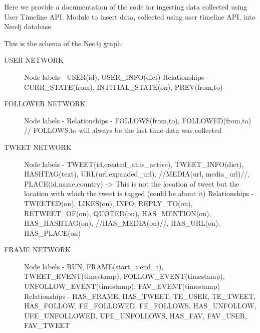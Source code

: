 \documentclass[letterpaper,10pt,english]{sphinxmanual}
\begin{document}
Here we provide a documentation of the code for ingesting data collected using User Timeline API.
\label{\detokenize{neo4j_data_ingestion:module-ingest_neo4j_user_timeline}}
Module to insert data, collected using user timeline API, into Neo4j database.

This is the schema of the Neo4j graph:
\begin{description}
\item[{USER NETWORK}] \leavevmode
Node labels - USER(id), USER\_INFO(dict)
Relationships - CURR\_STATE(from), INTITIAL\_STATE(on), PREV(from,to)

\item[{FOLLOWER NETWORK}] \leavevmode
Node labels -
Relationships - FOLLOWS(from,to), FOLLOWED(from,to) // FOLLOWS.to will always be the last time data was collected

\item[{TWEET NETWORK}] \leavevmode
Node labels - TWEET(id,created\_at,is\_active), TWEET\_INFO(dict), HASHTAG(text), URL(url,expanded\_url), //MEDIA(url, media\_url)//, PLACE(id,name,country) -\textgreater{} This is not the location of tweet but the location with which the tweet is tagged (could be about it)
Relationships - TWEETED(on), LIKES(on), INFO, REPLY\_TO(on), RETWEET\_OF(on), QUOTED(on), HAS\_MENTION(on), HAS\_HASHTAG(on), //HAS\_MEDIA(on)//, HAS\_URL(on), HAS\_PLACE(on)

\item[{FRAME NETWORK}] \leavevmode
Node labels - RUN, FRAME(start\_t,end\_t), TWEET\_EVENT(timestamp), FOLLOW\_EVENT(timestamp), UNFOLLOW\_EVENT(timestamp), FAV\_EVENT(timestamp)
Relationships - HAS\_FRAME, HAS\_TWEET, TE\_USER, TE\_TWEET, HAS\_FOLLOW, FE\_FOLLOWED, FE\_FOLLOWS, HAS\_UNFOLLOW, UFE\_UNFOLLOWED, UFE\_UNFOLLOWS, HAS\_FAV, FAV\_USER, FAV\_TWEET

\end{description}
\end{document}
